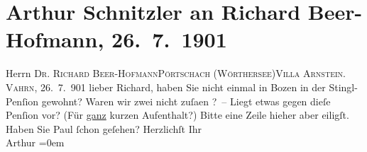

         
         \renewcommand{\erwaehntePersonen}{Personen: Richard Beer-Hofmann, Paul Goldmann}
         \renewcommand{\erwaehnteOrte}{Orte: Bozen, Hotel Stiegl, Pörtschach, Vahrn, Villa Arnstein}
         \renewcommand{\erwaehnteWerke}{}
               \section[Arthur Schnitzler an Richard Beer-Hofmann, 26. 7. 1901]{ Arthur Schnitzler an Richard Beer-Hofmann, 26. 7. 1901}\nopagebreak{}\rehead{ }\begin{ledgroupsized}[t]{13cm}\normalsize\beginnumbering \toendnotes[C]{\smallbreak\pagebreak[2]} 
\toendnotes[C]{\smallbreak}\pstart{}{\pb}Herrn \textsc{Dr. Richard
                     Beer-Hofmann}\pend{}\pstart{}\textsc{Pörtschach (Wörthersee)}\pend{}\pstart{}\textsc{Villa Arnstein.}\pend{}{\bigskip}\pstart
           \raggedleft{}{\pb}\textsc{Vahrn}, 26. 7. 901\pend
           \pstart
           lieber Richard, haben Sie nicht einmal in Bozen in der Stingl-Penſion gewohnt? Waren wir zwei nicht zuſa{\geminationm}en \label{K_L01152-1v}\label{K_L01152-1h}? – Liegt etwas gegen dieſe Penſion vor? (Für \uline{ganz} kurzen Aufenthalt?) Bitte eine Zeile hieher {\pb}aber eiligſt.\pend
           \pstart
           Haben Sie Paul ſchon geſehen?\pend
           \pstart
           Herzlichſt Ihr{\\[\baselineskip]}\spacefill\mbox{Arthur}\pend
           \leftskip=0em{}
         
         \endnumbering{}\end{ledgroupsized}  \newcommand{\dateiname}{L01152}\newcommand{\titel}{Arthur Schnitzler an Richard Beer-Hofmann, 26. 7. 1901}\newcommand{\editorInnen}{Martin Anton Müller und Gerd-Hermann Susen}
      